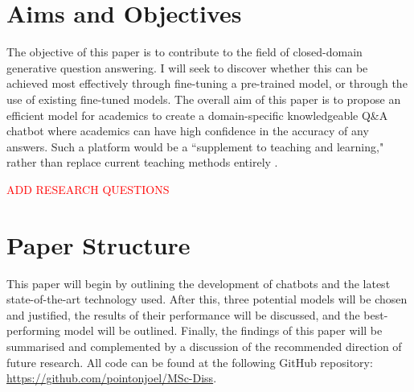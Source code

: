\section{Aims and Objectives} %
\label{sec:intro_aims_and_objectives}

The objective of this paper is to contribute to the field of closed-domain generative question answering. I will seek to discover whether this can be achieved most effectively through fine-tuning a pre-trained model, or through the use of existing fine-tuned models. The overall aim of this paper is to propose an efficient model for academics to create a domain-specific knowledgeable Q\&A chatbot where academics can have high confidence in the accuracy of any answers. Such a platform would be a ``supplement to teaching and learning," rather than replace current teaching methods entirely \citep{Nee2023ExploringTT}. 



\textcolor{red}{ADD RESEARCH QUESTIONS}


\section{Paper Structure}
\label{sec:intro_paper_structure}

This paper will begin by outlining the development of chatbots and the latest state-of-the-art technology used. After this, three potential models will be chosen and justified, the results of their performance will be discussed, and the best-performing model will be outlined. Finally, the findings of this paper will be summarised and complemented by a discussion of the recommended direction of future research. All code can be found at the following GitHub repository: \url{https://github.com/pointonjoel/MSc-Diss}. %

